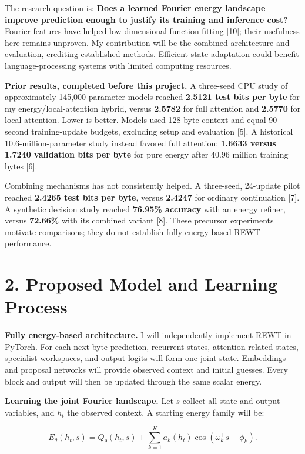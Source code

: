 \documentclass[11pt,letterpaper]{article}
\begin{document}
The research question is: \textbf{Does a learned Fourier energy landscape improve prediction enough to justify its training and inference cost?} Fourier features have helped low-dimensional function fitting [10]; their usefulness here remains unproven. My contribution will be the combined architecture and evaluation, crediting established methods. Efficient state adaptation could benefit language-processing systems with limited computing resources.

\textbf{Prior results, completed before this project.} A three-seed CPU study of approximately 145,000-parameter models reached \textbf{2.5121 test bits per byte} for my energy/local-attention hybrid, versus \textbf{2.5782} for full attention and \textbf{2.5770} for local attention. Lower is better. Models used 128-byte context and equal 90-second training-update budgets, excluding setup and evaluation [5]. A historical 10.6-million-parameter study instead favored full attention: \textbf{1.6633 versus 1.7240 validation bits per byte} for pure energy after 40.96 million training bytes [6].

Combining mechanisms has not consistently helped. A three-seed, 24-update pilot reached \textbf{2.4265 test bits per byte}, versus \textbf{2.4247} for ordinary continuation [7]. A synthetic decision study reached \textbf{76.95\% accuracy} with an energy refiner, versus \textbf{72.66\%} with its combined variant [8]. These precursor experiments motivate comparisons; they do not establish fully energy-based REWT performance.

\newpage
\section*{2. Proposed Model and Learning Process}

\textbf{Fully energy-based architecture.} I will independently implement REWT in PyTorch. For each next-byte prediction, recurrent states, attention-related states, specialist workspaces, and output logits will form one joint state. Embeddings and proposal networks will provide observed context and initial guesses. Every block and output will then be updated through the same scalar energy.

\textbf{Learning the joint Fourier landscape.} Let \(s\) collect all state and output variables, and \(h_t\) the observed context. A starting energy family will be:

\[
E_\theta(h_t,s)=Q_\theta(h_t,s)+\sum_{k=1}^{K}a_k(h_t)\cos(\omega_k^\top s+\phi_k).
\]
\end{document}
